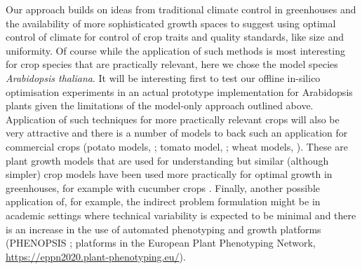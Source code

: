 
Our approach builds on ideas from traditional climate control in greenhouses and
the availability of more sophisticated growth spaces to suggest using optimal
control of climate for control of crop traits and quality standards, like size
and uniformity. Of course while the application of such methods is most
interesting for crop species that are practically relevant, here we chose the
model species \textit{Arabidopsis thaliana}. It will be interesting first to
test our offline in-silico optimisation experiments in an actual prototype
implementation for Arabidopsis plants given the limitations of the model-only
approach outlined above. Application of such techniques for more practically
relevant crops will also be very attractive and there is a number of models to
back such an application for commercial crops (potato models,
\cite{fleisher2017potato}; tomato model, \cite{heuvelink1999evaluation}; wheat
models, \cite{martre2015multimodel}). These are plant growth models that are
used for understanding but similar (although simpler) crop models have been used
more practically for optimal growth in greenhouses, for example with cucumber
crops \citep{challa_1990}.  Finally, another possible application of, for
example, the indirect problem formulation might be in academic settings where
technical variability is expected to be minimal and there is an increase in the
use of automated phenotyping and growth platforms (PHENOPSIS
\cite{granier_phenopsis_2006}; platforms in the European Plant Phenotyping
Network, \url{https://eppn2020.plant-phenotyping.eu/}).

